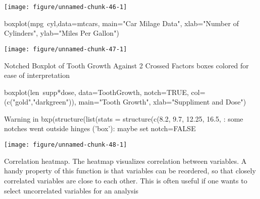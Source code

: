 \documentclass[a4paper,twoside]{tufte-book}\usepackage[]{graphicx}\usepackage[]{color}
\makeatletter
\def\maxwidth{ %
	\ifdim\Gin@nat@width>\linewidth
	\linewidth
	\else
	\Gin@nat@width
	\fi
}
\makeatother
\begin{document}
\begin{Anhang}
\begin{Schunk}
{\centering \texttt{[image: figure/unnamed-chunk-46-1]} 

}

\end{Schunk}



\begin{Schunk}
\begin{Sinput}
boxplot(mpg~cyl,data=mtcars, main="Car Milage Data", 
   xlab="Number of Cylinders", ylab="Miles Per Gallon")
\end{Sinput}


{\centering \texttt{[image: figure/unnamed-chunk-47-1]} 

}

\end{Schunk}

Notched Boxplot of Tooth Growth Against 2 Crossed Factors
boxes colored for ease of interpretation 

\begin{Schunk}
\begin{Sinput}
boxplot(len~supp*dose, data=ToothGrowth, notch=TRUE, 
  col=(c("gold","darkgreen")),
  main="Tooth Growth", xlab="Suppliment and Dose")
\end{Sinput}
\begin{Soutput}
Warning in bxp(structure(list(stats = structure(c(8.2, 9.7, 12.25, 16.5, : some notches went outside hinges ('box'): maybe set notch=FALSE
\end{Soutput}


{\centering \texttt{[image: figure/unnamed-chunk-48-1]} 

}

\end{Schunk}



Correlation heatmap. The heatmap visualizes correlation between variables. A handy property of this function is that variables can be reordered, so that closely correlated variables are close to each other. This is often useful if one wants to select uncorrelated variables for an analysis


\end{Anhang}
\end{document}
